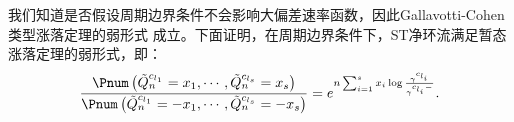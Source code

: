 


我们知道是否假设周期边界条件不会影响大偏差速率函数，因此Gallavotti-Cohen类型涨落定理的弱形式 \cite{pedraza2008effects} 成立。下面证明，在周期边界条件下，ST净环流满足暂态涨落定理的弱形式，即：
\begin{equation}\label{weak2}
    \begin{split}
    \frac{\Pnum\left(\tilde{Q}^{c_{l_1}}_n=x_1,\cdots, \tilde{Q}^{c_{l_s}}_n=x_{s}\right)}
    {\Pnum\left(\tilde{Q}^{c_{l_1}}_n=-x_1,\cdots, \tilde{Q}^{c_{l_s}}_n=-x_{s}\right)}
    =e^{n\sum_{i=1}^{s}x_i\log\frac{\gamma^{c_{l_i}}}{\gamma^{c_{l_i}-}}}.
    \end{split}
\end{equation}
